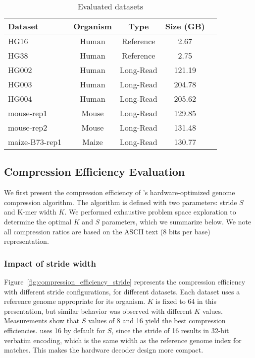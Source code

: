 \begin{table}[htb]
    \centering
    \caption{Evaluated datasets}
    \label{tab:evaluated_datasets}
    \begin{tabular}{|l|c|c|c|c}
        \hline
        Dataset & Organism & Type & Size (GB) \\
        \hline
        \hline
         HG16~\cite{raney2024ucsc} & Human & Reference & 2.67 \\
         HG38~\cite{raney2024ucsc} & Human & Reference & 2.75 \\
         \hline
         HG002~\cite{HG002} & Human & Long-Read & 121.19 \\
         HG003~\cite{HG003} & Human & Long-Read & 204.78 \\
         HG004~\cite{HG004} & Human & Long-Read & 205.62 \\
         mouse-rep1~\cite{mouse-rep1} & Mouse & Long-Read & 129.85 \\
         mouse-rep2~\cite{mouse-rep2} & Mouse & Long-Read & 131.48 \\
         maize-B73-rep1~\cite{maize-B73-rep1} & Maize & Long-Read & 130.77 \\
        \hline
    \end{tabular}
\end{table}


\subsection{Compression Efficiency Evaluation}
\label{sec:compression_efficiency}

We first present the compression efficiency of \name{}'s hardware-optimized genome compression algorithm.
The algorithm is defined with two parameters: stride $S$ and K-mer width $K$.
We performed exhaustive problem space exploration to determine the optimal $K$ and $S$ parameters, which we summarize below.
We note all compression ratios are based on the ASCII text (8 bits per base)  representation.

\subsubsection{Impact of stride width}
Figure~\ref{fig:compression_efficiency_stride} represents the compression efficiency with different stride configurations, for different datasets.
Each dataset uses a reference genome appropriate for its organism.
$K$ is fixed to 64 in this presentation, but similar behavior was observed with different $K$ values.
Measurements show that $S$ values of 8 and 16 yield the best compression efficiencies.
\name{} uses 16 by default for $S$, since the stride of 16 results in 32-bit verbatim encoding, which is the same width as the reference genome index for matches.
This makes the hardware decoder design more compact.

